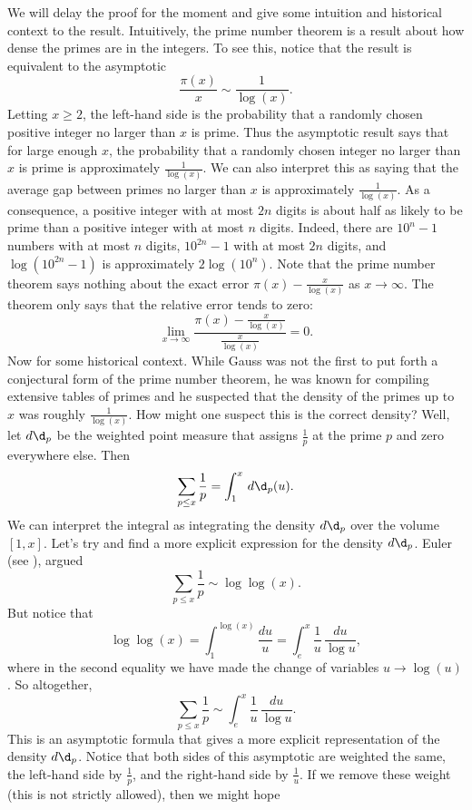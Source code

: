       We will delay the proof for the moment and give some intuition and historical context to the result. Intuitively, the prime number theorem is a result about how dense the primes are in the integers. To see this, notice that the result is equivalent to the asymptotic
      \[
        \frac{\pi(x)}{x} \sim \frac{1}{\log(x)}.
      \]
      Letting $x \ge 2$, the left-hand side is the probability that a randomly chosen positive integer no larger than $x$ is prime. Thus the asymptotic result says that for large enough $x$, the probability that a randomly chosen integer no larger than $x$ is prime is approximately $\frac{1}{\log(x)}$. We can also interpret this as saying that the average gap between primes no larger than $x$ is approximately $\frac{1}{\log(x)}$. As a consequence, a positive integer with at most $2n$ digits is about half as likely to be prime than a positive integer with at most $n$ digits. Indeed, there are $10^{n}-1$ numbers with at most $n$ digits, $10^{2n}-1$ with at most $2n$ digits, and $\log(10^{2n}-1)$ is approximately $2\log(10^{n})$. Note that the prime number theorem says nothing about the exact error $\pi(x)-\frac{x}{\log(x)}$ as $x \to \infty$. The theorem only says that the relative error tends to zero:
      \[
        \lim_{x \to \infty}\frac{\pi(x)-\frac{x}{\log(x)}}{\frac{x}{\log(x)}} = 0.
      \]
      Now for some historical context. While Gauss was not the first to put forth a conjectural form of the prime number theorem, he was known for compiling extensive tables of primes and he suspected that the density of the primes up to $x$ was roughly $\frac{1}{\log(x)}$. How might one suspect this is the correct density? Well, let $d\d_{p}$ be the weighted point measure that assigns $\frac{1}{p}$ at the prime $p$ and zero everywhere else. Then
      \[
        \sum_{p \le x}\frac{1}{p} = \int_{1}^{x}\,d\d_{p}(u).
      \]
      We can interpret the integral as integrating the density $d\d_{p}$ over the volume $[1,x]$. Let's try and find a more explicit expression for the density $d\d_{p}$. Euler (see \cite{euler1744variae}), argued
      \[
        \sum_{p \le x}\frac{1}{p} \sim \log\log(x).
      \]
      But notice that
      \[
        \log\log(x) = \int_{1}^{\log(x)}\frac{du}{u} = \int_{e}^{x}\frac{1}{u}\,\frac{du}{\log{u}},
      \]
      where in the second equality we have made the change of variables $u \to \log(u)$. So altogether,
      \[
        \sum_{p \le x}\frac{1}{p} \sim \int_{e}^{x}\frac{1}{u}\,\frac{du}{\log{u}}.
      \]
      This is an asymptotic formula that gives a more explicit representation of the density $d\d_{p}$. Notice that both sides of this asymptotic are weighted the same, the left-hand side by $\frac{1}{p}$, and the right-hand side by $\frac{1}{u}$. If we remove these weight (this is not strictly allowed), then we might hope
